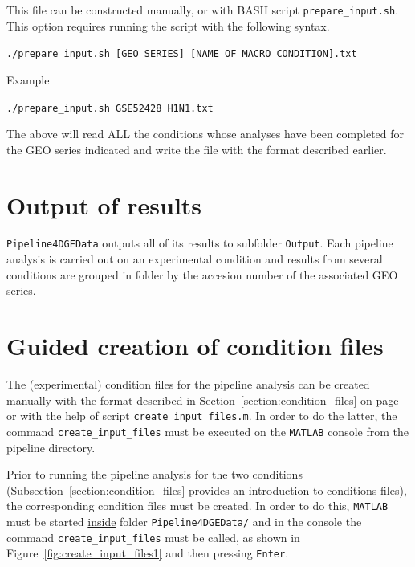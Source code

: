 \documentclass[final,letterpaper,12pt]{article}
\begin{document}
\par This file can be constructed manually, or with BASH script \texttt{prepare\_input.sh}. This option requires running the script with the following syntax.

\texttt{./prepare\_input.sh [GEO SERIES] [NAME OF MACRO CONDITION].txt}

\par Example

\texttt{./prepare\_input.sh GSE52428 H1N1.txt}

\par The above will read ALL the conditions whose analyses have been completed for the GEO series indicated and write the file with the format described earlier.

\section{Output of results}
\label{section:pipelineoutput}

\par \texttt{Pipeline4DGEData} outputs all of its results to subfolder \texttt{Output}. Each pipeline analysis is carried out on an experimental condition and results from several conditions are grouped in folder by the accesion number of the associated GEO series.

\section{Guided creation of condition files}
\label{section:user_functions}

\par The (experimental) condition files for the pipeline analysis can be created manually with the format described in Section~\ref{section:condition_files} on page \pageref{section:condition_files} or with the help of script \texttt{create\_input\_files.m}. In order to do the latter, the command \texttt{create\_input\_files} must be executed on the \texttt{MATLAB} console from the pipeline directory.

\par Prior to running the pipeline analysis for the two conditions (Subsection~\ref{section:condition_files} provides an introduction to conditions files), the corresponding condition files must be created. In order to do this, \texttt{MATLAB} must be started \underline{inside} folder \texttt{Pipeline4DGEData/} and in the console the command \texttt{create\_input\_files} must be called, as shown in Figure~\ref{fig:create_input_files1} and then pressing \texttt{Enter}.
\end{document}
